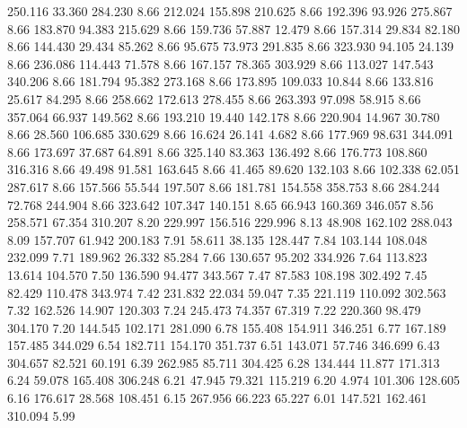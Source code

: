  250.116   33.360  284.230         8.66
 212.024  155.898  210.625         8.66
 192.396   93.926  275.867         8.66
 183.870   94.383  215.629         8.66
 159.736   57.887   12.479         8.66
 157.314   29.834   82.180         8.66
 144.430   29.434   85.262         8.66
  95.675   73.973  291.835         8.66
 323.930   94.105   24.139         8.66
 236.086  114.443   71.578         8.66
 167.157   78.365  303.929         8.66
 113.027  147.543  340.206         8.66
 181.794   95.382  273.168         8.66
 173.895  109.033   10.844         8.66
 133.816   25.617   84.295         8.66
 258.662  172.613  278.455         8.66
 263.393   97.098   58.915         8.66
 357.064   66.937  149.562         8.66
 193.210   19.440  142.178         8.66
 220.904   14.967   30.780         8.66
  28.560  106.685  330.629         8.66
  16.624   26.141    4.682         8.66
 177.969   98.631  344.091         8.66
 173.697   37.687   64.891         8.66
 325.140   83.363  136.492         8.66
 176.773  108.860  316.316         8.66
  49.498   91.581  163.645         8.66
  41.465   89.620  132.103         8.66
 102.338   62.051  287.617         8.66
 157.566   55.544  197.507         8.66
 181.781  154.558  358.753         8.66
 284.244   72.768  244.904         8.66
 323.642  107.347  140.151         8.65
  66.943  160.369  346.057         8.56
 258.571   67.354  310.207         8.20
 229.997  156.516  229.996         8.13
  48.908  162.102  288.043         8.09
 157.707   61.942  200.183         7.91
  58.611   38.135  128.447         7.84
 103.144  108.048  232.099         7.71
 189.962   26.332   85.284         7.66
 130.657   95.202  334.926         7.64
 113.823   13.614  104.570         7.50
 136.590   94.477  343.567         7.47
  87.583  108.198  302.492         7.45
  82.429  110.478  343.974         7.42
 231.832   22.034   59.047         7.35
 221.119  110.092  302.563         7.32
 162.526   14.907  120.303         7.24
 245.473   74.357   67.319         7.22
 220.360   98.479  304.170         7.20
 144.545  102.171  281.090         6.78
 155.408  154.911  346.251         6.77
 167.189  157.485  344.029         6.54
 182.711  154.170  351.737         6.51
 143.071   57.746  346.699         6.43
 304.657   82.521   60.191         6.39
 262.985   85.711  304.425         6.28
 134.444   11.877  171.313         6.24
  59.078  165.408  306.248         6.21
  47.945   79.321  115.219         6.20
   4.974  101.306  128.605         6.16
 176.617   28.568  108.451         6.15
 267.956   66.223   65.227         6.01
 147.521  162.461  310.094         5.99

